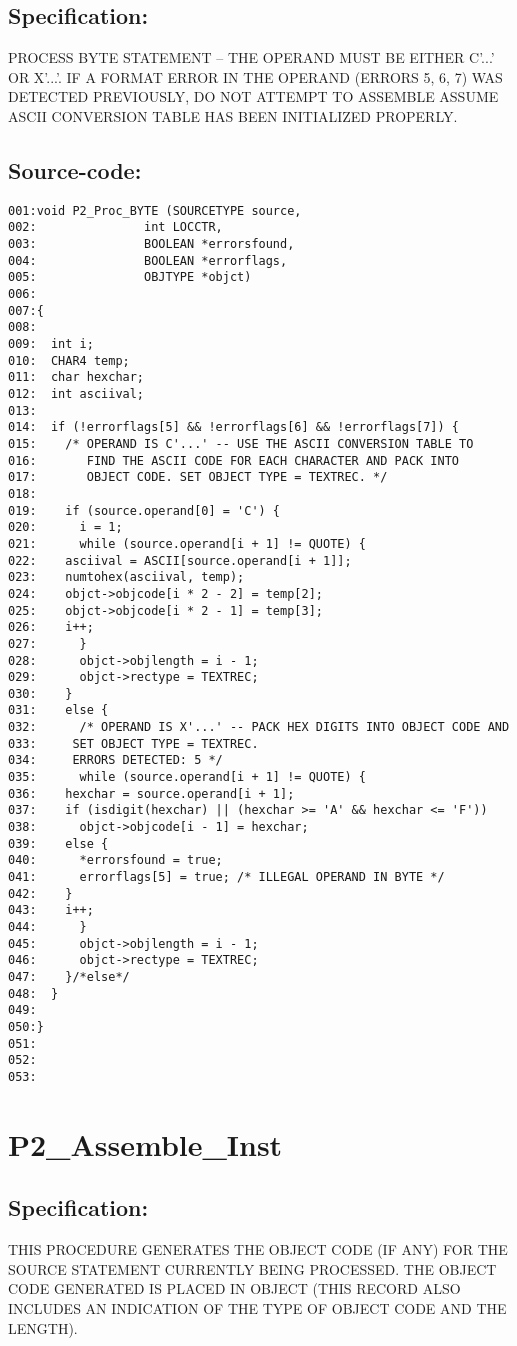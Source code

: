 \subsection*{Specification:}
PROCESS BYTE STATEMENT -- THE OPERAND MUST BE EITHER C'...' OR X'...'.  IF A
FORMAT ERROR IN THE OPERAND (ERRORS 5, 6, 7) WAS DETECTED PREVIOUSLY, DO NOT
ATTEMPT TO ASSEMBLE ASSUME ASCII CONVERSION TABLE HAS BEEN INITIALIZED
PROPERLY.
\subsection*{Source-code:}
\begin{verbatim}
001:void P2_Proc_BYTE (SOURCETYPE source,
002:               int LOCCTR,
003:               BOOLEAN *errorsfound,
004:               BOOLEAN *errorflags,
005:               OBJTYPE *objct)
006:
007:{
008:
009:  int i;
010:  CHAR4 temp;
011:  char hexchar;
012:  int asciival;
013:
014:  if (!errorflags[5] && !errorflags[6] && !errorflags[7]) {
015:    /* OPERAND IS C'...' -- USE THE ASCII CONVERSION TABLE TO
016:       FIND THE ASCII CODE FOR EACH CHARACTER AND PACK INTO
017:       OBJECT CODE. SET OBJECT TYPE = TEXTREC. */
018:
019:    if (source.operand[0] = 'C') {
020:      i = 1;
021:      while (source.operand[i + 1] != QUOTE) {
022:    asciival = ASCII[source.operand[i + 1]];
023:    numtohex(asciival, temp);
024:    objct->objcode[i * 2 - 2] = temp[2];
025:    objct->objcode[i * 2 - 1] = temp[3];
026:    i++;
027:      }
028:      objct->objlength = i - 1;
029:      objct->rectype = TEXTREC;
030:    } 
031:    else {
032:      /* OPERAND IS X'...' -- PACK HEX DIGITS INTO OBJECT CODE AND
033:     SET OBJECT TYPE = TEXTREC.
034:     ERRORS DETECTED: 5 */
035:      while (source.operand[i + 1] != QUOTE) {
036:    hexchar = source.operand[i + 1];
037:    if (isdigit(hexchar) || (hexchar >= 'A' && hexchar <= 'F'))
038:      objct->objcode[i - 1] = hexchar;
039:    else {
040:      *errorsfound = true;
041:      errorflags[5] = true; /* ILLEGAL OPERAND IN BYTE */
042:    }
043:    i++;
044:      }
045:      objct->objlength = i - 1;
046:      objct->rectype = TEXTREC;
047:    }/*else*/
048:  }
049:
050:}
051:
052:
053:
\end{verbatim}
\section{P2\_Assemble\_Inst}
\subsection*{Specification:}
THIS PROCEDURE GENERATES THE OBJECT CODE (IF ANY) FOR THE SOURCE STATEMENT
CURRENTLY BEING PROCESSED. THE OBJECT CODE GENERATED IS PLACED IN OBJECT
(THIS RECORD ALSO INCLUDES AN INDICATION OF THE TYPE OF OBJECT CODE AND THE
LENGTH).

